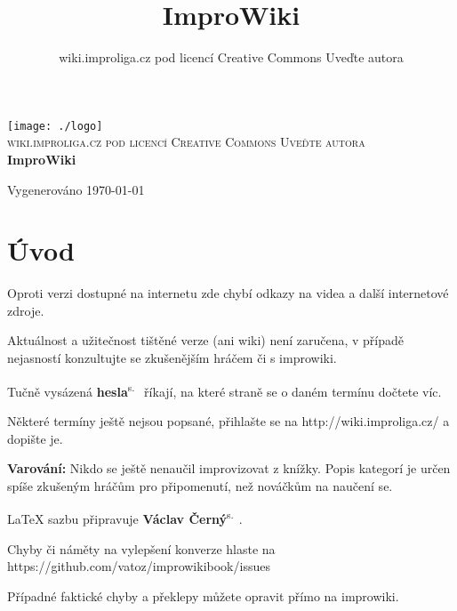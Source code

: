 \documentclass[a4paper,10pt,openany]{book}
\title{ImproWiki}
\author{wiki.improliga.cz pod licencí Creative Commons Uveďte autora}
\newcommand{\odkaz}[2]{\textbf{#1}\textsuperscript{s.~\pageref{#2}}}
\begin{document}
\begin{titlepage}
\begin{center}

\texttt{[image: ./logo]}~\\[2cm]

\textsc{\Large wiki.improliga.cz pod licencí Creative Commons Uveďte autora }\\[0.5cm]

\HRule %
{ \huge \bfseries ImproWiki \\[0.4cm] }

\HRule %


\vfill

{\large Vygenerováno \today}

\end{center}




\end{titlepage}
 
\chapter{Úvod}\label{úvod}

 

Oproti verzi dostupné na internetu zde chybí odkazy na videa a další internetové zdroje.

Aktuálnost a užitečnost tištěné verze (ani wiki) není zaručena, v případě nejasností konzultujte se zkušenějším hráčem či s improwiki.

Tučně vysázená \odkaz{hesla}{úvod} říkají, na které straně se o daném termínu dočtete víc.

Některé termíny ještě nejsou popsané, přihlašte se na http://wiki.improliga.cz/ a dopište je.

\textbf{Varování:} Nikdo se ještě nenaučil improvizovat z knížky. Popis kategorí je určen spíše zkušeným hráčům pro připomenutí, než nováčkům na naučení se.  

\LaTeX{} sazbu připravuje  \odkaz{Václav Černý}{uživatel:vatoz}.

Chyby či náměty na vylepšení konverze hlaste na https://github.com/vatoz/improwikibook/issues

Případné faktické chyby a překlepy můžete opravit přímo na improwiki.
\end{document}
